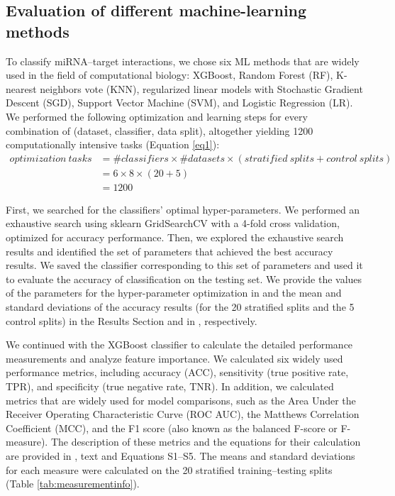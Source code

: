 \documentclass{bmcart}
\begin{document}
\subsection*{Evaluation of different machine-learning methods} \label{method_ml_methods}
To classify miRNA--target interactions, we chose six ML methods that are widely used in the field of computational biology: XGBoost\cite{xgboost}, Random Forest (RF), K-nearest neighbors vote (KNN), regularized linear models with Stochastic Gradient Descent (SGD), Support Vector Machine (SVM), and Logistic Regression (LR).
We performed the following optimization and learning steps for every combination of (dataset, classifier, data split), altogether yielding 1200 computationally intensive tasks (Equation \ref{eq1}):
\begin{equation} \label{eq1}
\begin{split}
optimization \: tasks & = \#classifiers \times \#datasets \times \left (stratified\: splits + control\: splits \right ) \\
 & = 6 \times8 \times( 20 + 5 ) \\
 & = 1200
\end{split}
\end{equation}

First, we searched for the classifiers' optimal hyper-parameters. We performed an exhaustive search using sklearn GridSearchCV with a 4-fold cross validation, optimized for accuracy performance. Then, we explored the exhaustive search results and identified the set of parameters that achieved the best accuracy results. We saved the classifier corresponding to this set of parameters and used it to evaluate the accuracy of classification on the testing set. We provide the values of the parameters for the hyper-parameter optimization in  and the  mean and standard deviations of the accuracy results (for the 20 stratified splits and the 5 control splits) in the Results Section and in , respectively.

We continued with the XGBoost classifier to calculate the detailed performance measurements and analyze feature importance. We calculated six widely used performance metrics, including accuracy (ACC), sensitivity (true positive rate, TPR), and specificity (true negative rate, TNR). In addition, we calculated metrics that are widely used for model comparisons, such as the Area Under the Receiver Operating Characteristic Curve (ROC AUC), the Matthews Correlation Coefficient (MCC), and the F1 score (also known as the balanced F-score or F-measure). The description of these metrics and the equations for their calculation are provided in , text and Equations S1--S5.
The means and standard deviations for each measure were calculated on the 20 stratified training--testing splits (Table \ref{tab:measurementinfo}).
\end{document}
